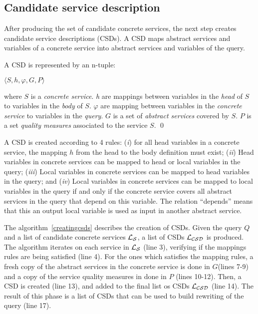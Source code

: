 
\subsection{Candidate service description}

After producing the set of candidate concrete services, the next step 
creates candidate service descriptions (CSDs). 
A CSD maps abstract services and variables of a concrete service into abstract 
services and variables of the query. 

\begin{definition}
A CSD is represented by an n-tuple:
\begin{center}
$\langle S, h, \varphi, G, P\rangle$
\end{center}
where $S$ is a \textit{concrete service}. 
\textit{h} are mappings between variables in the \textit{head} of $S$ to variables in the \textit{body} of $S$. 
$\varphi$ are mapping between variables in the \textit{concrete service} to variables in the \textit{query}.
$G$ is a set of \textit{abstract services} covered by $S$. 
$P$ is a set \textit{quality measures} associated to the service $S$. 
\qed
\end{definition} 
 
A CSD is created according to 4 rules: (\textit{i}) for all head variables in a
concrete service, the mapping $h$ from the head to the body definition must
exist; (\textit{ii}) Head variables in concrete services can be mapped to head
or local variables in the query; (\textit{iii}) Local variables in concrete
services can be mapped to head variables in the query; and (\textit{iv}) Local
variables in concrete services can be mapped to local variables in the query if and only if the concrete service covers all abstract services in the query that depend on this variable. The relation ``depends''  means that this an output local variable is used as input in another abstract service.

The algorithm~\ref{creatingcsds} describes the creation of CSDs. Given the query $Q$ and a list of candidate concrete services $\hbox{${\cal L_{S}}$}$, a list of CSDs $\hbox{${\cal L_{CSD}}$}$ is produced. 
The algorithm iterates on each service in $\hbox{${\cal L_{S}}$}$ (line 3), verifying if the mappings rules are being satisfied (line 4). For the ones which satisfies the mapping rules, a fresh copy of the abstract services in the concrete service is done in $G$(lines 7-9) and a copy of the service quality measures in done in $P$ (lines 10-12). Then,
a CSD is created (line 13), and added to the final list os CSDs $\hbox{${\cal L_{CSD}}$}$ (line 14).
The result of this phase is a list of CSDs that can be used to build rewriting of the query (line 17).

